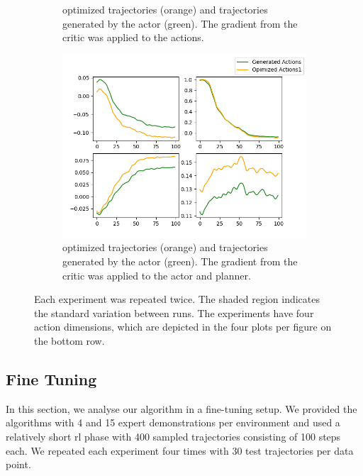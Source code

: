 \begin{figure}[htbp]
\begin{subfigure}[t]{0.45\textwidth}
      \caption{optimized trajectories (orange) and trajectories generated by the actor (green). The gradient from the critic was applied to the actions.}
      \label{fig:direct_actions}
    \end{subfigure}
    \hfill
    \begin{subfigure}[t]{0.45\textwidth}
      \includegraphics[width=\textwidth]{images/Plan_vs_Actions/changes/plans_actor_0.png}
      \caption{optimized trajectories (orange) and trajectories generated by the actor (green). The gradient from the critic was applied to the actor and planner.}
      \label{fig:ac_pl_actions}
    \end{subfigure}
    \caption{Each experiment was repeated twice. The shaded region indicates the standard variation between runs. 
      The experiments have four action dimensions, which are depicted in the 
      four plots per figure on the bottom row.}
    \label{fig:action_vs_actor}
\end{figure}

\subsection{Fine Tuning}
\label{sec:fine_tuning}
In this section, we analyse our algorithm in a fine-tuning setup. We provided the algorithms with 4 and 15 expert demonstrations per 
environment and used a relatively short \ac{rl} phase with 400 sampled trajectories consisting of 100 steps each. We 
repeated each experiment four times with 30 test trajectories per data point.\\


